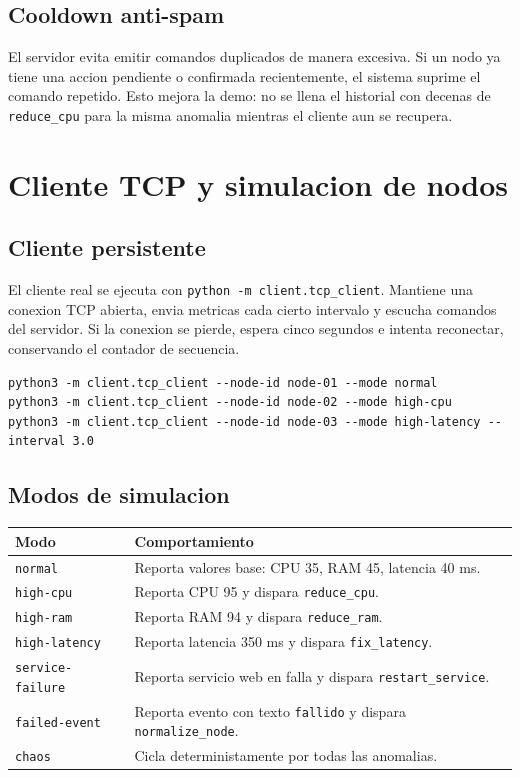 \documentclass[11pt,letterpaper]{article}
\begin{document}
\subsection{Cooldown anti-spam}

El servidor evita emitir comandos duplicados de manera excesiva. Si un nodo ya
tiene una accion pendiente o confirmada recientemente, el sistema suprime el
comando repetido. Esto mejora la demo: no se llena el historial con decenas de
\texttt{reduce\_cpu} para la misma anomalia mientras el cliente aun se recupera.

\newpage
\section{Cliente TCP y simulacion de nodos}

\subsection{Cliente persistente}

El cliente real se ejecuta con \texttt{python -m client.tcp\_client}. Mantiene una
conexion TCP abierta, envia metricas cada cierto intervalo y escucha comandos del
servidor. Si la conexion se pierde, espera cinco segundos e intenta reconectar,
conservando el contador de secuencia.

\begin{lstlisting}[style=terminal]
python3 -m client.tcp_client --node-id node-01 --mode normal
python3 -m client.tcp_client --node-id node-02 --mode high-cpu
python3 -m client.tcp_client --node-id node-03 --mode high-latency --interval 3.0
\end{lstlisting}

\subsection{Modos de simulacion}

\begin{longtable}{|p{}|p{}|}
\hline
\textbf{Modo} & \textbf{Comportamiento} \\
\hline
\texttt{normal} & Reporta valores base: CPU 35, RAM 45, latencia 40 ms. \\
\hline
\texttt{high-cpu} & Reporta CPU 95 y dispara \texttt{reduce\_cpu}. \\
\hline
\texttt{high-ram} & Reporta RAM 94 y dispara \texttt{reduce\_ram}. \\
\hline
\texttt{high-latency} & Reporta latencia 350 ms y dispara \texttt{fix\_latency}. \\
\hline
\texttt{service-failure} & Reporta servicio web en falla y dispara \texttt{restart\_service}. \\
\hline
\texttt{failed-event} & Reporta evento con texto \texttt{fallido} y dispara \texttt{normalize\_node}. \\
\hline
\texttt{chaos} & Cicla deterministamente por todas las anomalias. \\
\hline
\end{longtable}
\end{document}
